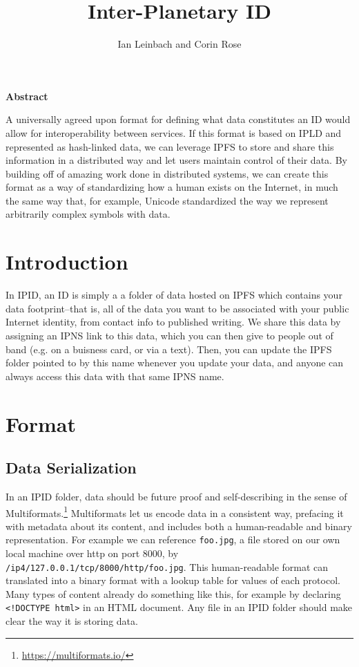\documentclass{article}
\author{Ian Leinbach and Corin Rose}
\title{Inter-Planetary ID}
\begin{document}
\maketitle

\begin{center}
\textbf{Abstract} 
\end{center}

A universally agreed upon format for defining what data constitutes an ID would allow for interoperability between services. If this format is based on IPLD and represented as hash-linked data, we can leverage IPFS to store and share this information in a distributed way and let users maintain control of their data. By building off of amazing work done in distributed systems, we can create this format as a way of standardizing how a human exists on the Internet, in much the same way that, for example, Unicode standardized the way we represent arbitrarily complex symbols with data.  

\section{Introduction}
In IPID, an ID is simply a a folder of data hosted on IPFS which contains your data footprint--that is, all of the data you want to be associated with your public Internet identity, from contact info to published writing. We share this data by assigning an IPNS link to this data, which you can then give to people out of band (e.g. on a buisness card, or via a text). Then, you can update the IPFS folder pointed to by this name whenever you update your data, and anyone can always access this data with that same IPNS name. 

\section{Format}

\subsection{Data Serialization}

In an IPID folder, data should be future proof and self-describing in the sense of Multiformats.\footnote{\url{https://multiformats.io/}} Multiformats let us encode data in a consistent way, prefacing it with metadata about its content, and includes both a human-readable and binary representation. For example we can reference \texttt{foo.jpg}, a file stored on our own local machine over http on port 8000, by \texttt{/ip4/127.0.0.1/tcp/8000/http\-/foo.jpg}. This human-readable format can translated into a binary format with a lookup table for values of each protocol. Many types of content already do something like this, for example by declaring \texttt{<!DOCTYPE html>} in an HTML document. Any file in an IPID folder should make clear the way it is storing data.   
\end{document}
